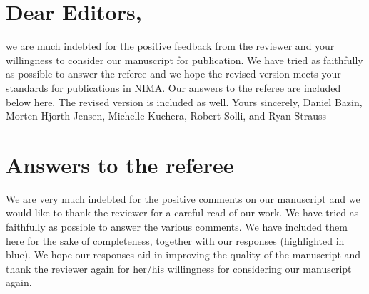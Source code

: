 \documentclass[12pt]{article}
\begin{document}
\section*{Dear Editors,}

we are much indebted for the positive feedback from the reviewer and your willingness to consider our manuscript for publication.
We have tried as faithfully as possible to answer the referee and we hope the revised version meets your standards for publications in NIMA.\newline
Our answers to the referee are included below here. The revised version is included as well.\newline
Yours sincerely,\newline
Daniel Bazin, Morten Hjorth-Jensen, Michelle Kuchera, Robert Solli, and Ryan Strauss

\section*{Answers to the referee}

We are very much indebted for the positive comments on our manuscript and we would like to  thank the reviewer for a careful read of our work. We have tried as faithfully as possible to answer the various comments. We have included them here for the sake of completeness, together with our responses
(highlighted in blue). We hope our responses  aid in improving the quality of the manuscript and thank the reviewer again for her/his willingness for considering our manuscript again.
\end{document}
